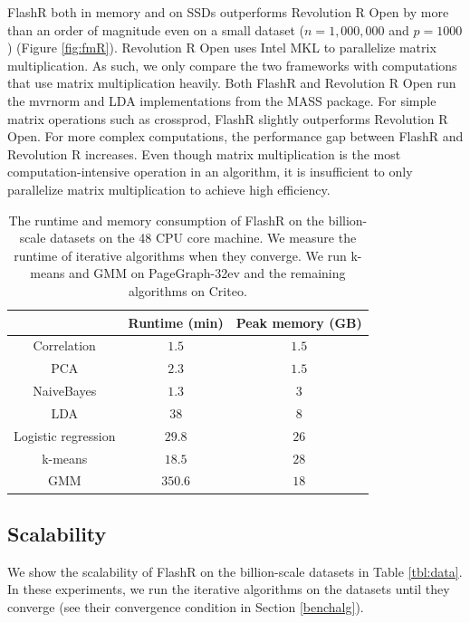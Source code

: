 FlashR both in memory and on SSDs outperforms Revolution R Open by more
than an order of magnitude even on a small dataset ($n=1,000,000$ and $p=1000$)
(Figure \ref{fig:fmR}).
Revolution R Open uses Intel MKL to parallelize matrix multiplication. As such,
we only compare the two frameworks with computations that use matrix
multiplication heavily. Both FlashR and Revolution R Open run the mvrnorm
and LDA implementations from the MASS package. For simple matrix operations
such as crossprod, FlashR slightly outperforms Revolution R Open.
For more complex computations, the performance gap between FlashR and
Revolution R increases. Even though matrix multiplication
is the most computation-intensive operation in an algorithm, it is insufficient
to only parallelize matrix multiplication to achieve high efficiency.

\begin{table}
\begin{center}
	\caption{The runtime and memory consumption of FlashR on the billion-scale
		datasets on the 48 CPU core machine. We measure the runtime of
                iterative algorithms when they converge. We run k-means and GMM
		on PageGraph-32ev and the remaining algorithms on Criteo.}
\vspace{-10pt}
\footnotesize
\begin{tabular}{|c|c|c|}
\hline
	& Runtime (min) & Peak memory (GB) \\
\hline
Correlation & $1.5$ & $1.5$ \\
\hline
PCA & $2.3$ & $1.5$ \\
\hline
NaiveBayes & $1.3$ & $3$ \\
\hline
LDA & $38$ & $8$ \\
\hline
Logistic regression & $29.8$ & $26$ \\
\hline
k-means & $18.5$ & $28$ \\
\hline
GMM & $350.6$ & $18$ \\
\hline
\end{tabular}
\normalsize
\label{tbl:scale}
\end{center}
\vspace{-10pt}
\end{table}

\subsection{Scalability}

We show the scalability of FlashR on the billion-scale datasets in Table
\ref{tbl:data}. In these experiments, we run the iterative algorithms on
the datasets until they converge (see their convergence condition in Section
\ref{benchalg}).

